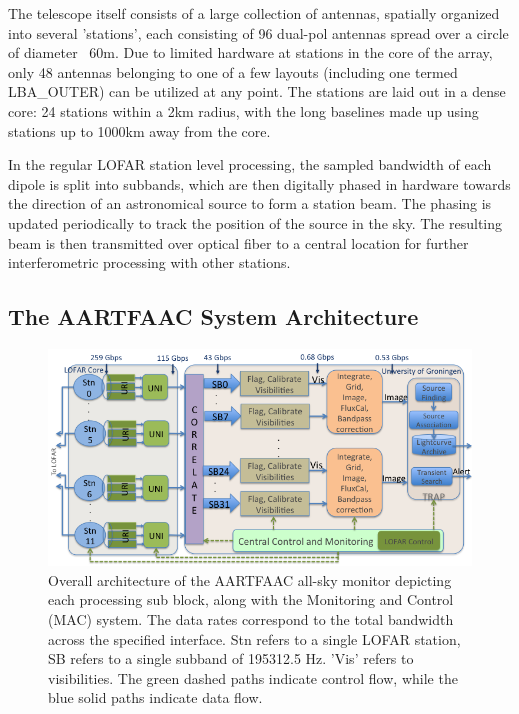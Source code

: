 \documentclass{ws-jai}
\begin{document}
The  telescope itself  consists of  a  large collection  of antennas,  spatially
organized  into several  'stations',  each consisting  of  96 dual-pol  antennas
spread over a circle  of diameter ~60m.  Due to limited  hardware at stations in
the  core of  the array,  only 48  antennas belonging  to one  of a  few layouts
(including one  termed LBA\_OUTER) can be  utilized at any point.   The stations
are laid  out in a dense  core: 24 stations within  a 2km radius, with  the long
baselines made up using stations up to 1000km away from the core.

In the  regular LOFAR station  level processing,  the sampled bandwidth  of each
dipole  is split  into subbands,  which are  then digitally  phased in  hardware
towards the  direction of  an astronomical  source to form  a station  beam. The
phasing  is updated  periodically to  track the  position of  the source  in the
sky. The  resulting beam  is then  transmitted over optical  fiber to  a central
location for further interferometric processing with other stations.

\subsection {\label{subsec:aartfaac}  The AARTFAAC System Architecture}
\begin{figure}[htbp]
\centering
\includegraphics[width=1\textwidth]{Figs/Overall_arch_afaac/Slide1.png}
\caption {Overall  architecture of the  AARTFAAC all-sky monitor  depicting each
  processing sub block, along with the  Monitoring and Control (MAC) system. The
  data  rates   correspond  to   the  total   bandwidth  across   the  specified
  interface. Stn refers to a single LOFAR station, SB refers to a single subband
  of 195312.5 Hz. 'Vis' refers to  visibilities. The green dashed paths indicate
  control flow, while the blue solid paths indicate data flow. }
\label{fig:afaac_arch}
\end{figure}
\end{document}
